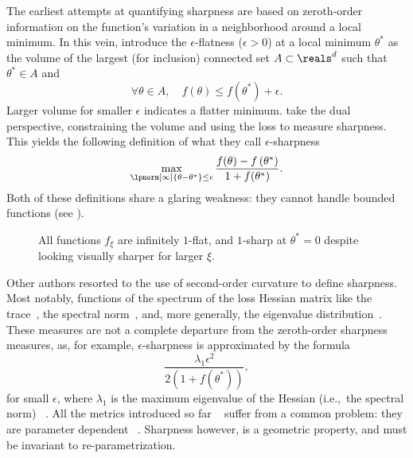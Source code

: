 The earliest attempts at quantifying sharpness are based on zeroth-order information
on the function's variation in a neighborhood around a local minimum.
In this vein, \citet{hochreiterFlatMinima1997} introduce
the \(\epsilon\)-flatness (\(\epsilon \gt 0\)) at a local minimum \(\theta^{\ast}\) as
the volume of the largest (for inclusion) connected set \(A \subset \reals^{d}\) such that
\(\theta^{\ast}\in A \) and
\begin{equation}\label{eq:sharpness:epsflatness}
	\forall \theta\in A, \quad f(\theta) \leq f(\theta^{\ast}) + \epsilon.
\end{equation}
Larger volume for smaller \(\epsilon\) indicates a flatter minimum.
\citet{keskarLargeBatchTrainingDeep2022} take the dual perspective,
constraining the volume and using the loss to measure sharpness.
This yields the following definition of what they call \(\epsilon\)-sharpness
\begin{equation}\label{eq:sharpness:epsharpness}
	\max_{\lpnorm[\infty]{\theta - \theta^{\ast}}\le\epsilon}%
	{\frac{f(\theta) - f\left( \theta^{\ast} \right)}{1+f(\theta^{\ast})}}.
\end{equation}
Both of these definitions share a glaring weakness: they cannot handle bounded functions
(see ).
\begin{figure}[hbt]
	\begin{center}
	\end{center}
	\caption{%
		All functions \(f_{\xi}\) are infinitely \(1\)-flat, and \(1\)-sharp at \(\theta^{\ast} = 0\)
		despite looking visually sharper for larger \(\xi\).
	}\label{fig:epsflat_counterexample}
\end{figure}

Other authors resorted to the use of second-order curvature to define sharpness.
Most notably, functions of the spectrum of the loss Hessian matrix
like the trace~\cite{%
	yangTaxonomizingLocalGlobal2021,%
	petzkaRelativeFlatnessGeneralization2021,%
	ibayashiMinimumSharpnessScaleinvariant2021,%
	leeNewCharacterizationEdge2022,%
	petzkaReparameterizationInvariantFlatnessMeasure2019%
}, the spectral norm~\cite{yangTaxonomizingLocalGlobal2021},
and, more generally, the eigenvalue distribution~\cite{%
	keskarLargeBatchTrainingDeep2022,%
	chaudhariEntropySGDBiasingGradient2019%
}.
These measures are not a complete departure from the zeroth-order sharpness measures,
as, for example, \(\epsilon\)-sharpness is approximated by the formula
\[
	\frac{\lambda_{1}\epsilon^{2}}{2 \left( 1+f\left( \theta^{\ast} \right) \right)},
\]
for small \(\epsilon\), where \(\lambda_{1}\) is the maximum eigenvalue of the Hessian
(i.e.,\ the spectral norm)%
~\cite{keskarLargeBatchTrainingDeep2022,zhangWhyFlatnessDoes2021,dinhSharpMinimaCan2017}.
All the metrics introduced so far%
~\cite[including the zeroth-order ones][]{ibayashiMinimumSharpnessScaleinvariant2021}
suffer from a common problem: they are parameter dependent%
~\cite{%
	dinhSharpMinimaCan2017,%
	jangReparametrizationInvariantSharpnessMeasure2022,zhangWhyFlatnessDoes2021,%
	liangFisherRaoMetricGeometry2019%
}.
Sharpness however, is a geometric property, and must be invariant to re-parametrization.

